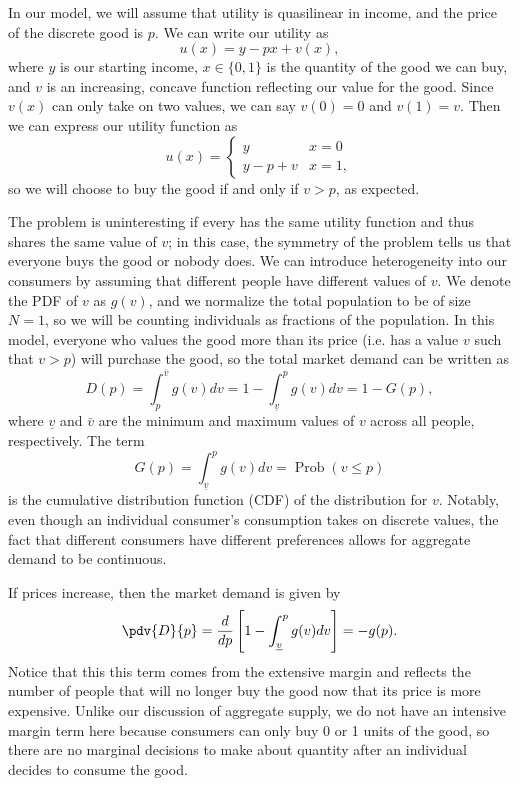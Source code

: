 In our model, we will assume that utility is quasilinear in income, and the price of the discrete good is $p$. We can write our utility as
$$u(x) = y - px + v(x),$$
where $y$ is our starting income, $x \in \{0, 1\}$ is the quantity of the good we can buy, and $v$ is an increasing, concave function reflecting our value for the good. Since $v(x)$ can only take on two values, we can say $v(0) = 0$ and $v(1) = v$. Then we can express our utility function as 
$$u(x) = \begin{cases}
    y & x = 0 \\
    y - p + v & x = 1,
\end{cases}$$
so we will choose to buy the good if and only if $v > p$, as expected.

The problem is uninteresting if every has the same utility function and thus shares the same value of $v$; in this case, the symmetry of the problem tells us that everyone buys the good or nobody does. We can introduce heterogeneity into our consumers by assuming that different people have different values of $v$. We denote the PDF of $v$ as $g(v)$, and we normalize the total population to be of size $N=1$, so we will be counting individuals as fractions of the population. In this model, everyone who values the good more than its price (i.e. has a value $v$ such that $v > p$) will purchase the good, so the total market demand can be written as
$$D(p)=\int_{p}^{\bar{v}} g(v) d v=1-\int_{\underline{v}}^{p} g(v) d v=1-G(p),$$
where $\underline{v}$ and $\bar{v}$ are the minimum and maximum values of $v$ across all people, respectively. The term
$$G(p) = \int_{\underline{v}}^{p} g(v) d v = \operatorname{Prob}(v \leq p)$$
is the cumulative distribution function (CDF) of the distribution for $v$. Notably, even though an individual consumer's consumption takes on discrete values, the fact that different consumers have different preferences allows for aggregate demand to be continuous.

If prices increase, then the market demand is given by 
$$\pdv{D}{p} = \frac{d}{d p}\left[1-\int_{\underline{v}}^{p} g(v) d v\right]=-g(p).$$
Notice that this this term comes from the extensive margin and reflects the number of people that will no longer buy the good now that its price is more expensive. Unlike our discussion of aggregate supply, we do not have an intensive margin term here because consumers can only buy 0 or 1 units of the good, so there are no marginal decisions to make about quantity after an individual decides to consume the good.

